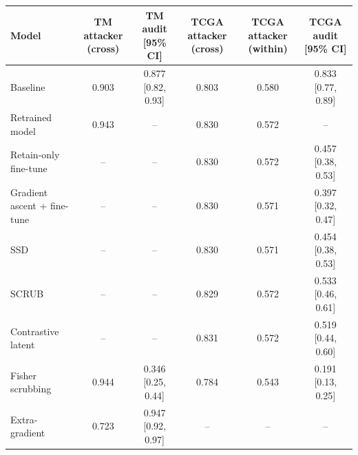 \begin{tabular}{lccccc}
\toprule
Model & TM attacker (cross) & TM audit [95\% CI] & TCGA attacker (cross) & TCGA attacker (within) & TCGA audit [95\% CI] \\
\midrule
Baseline & 0.903 & 0.877 [0.82, 0.93] & 0.803 & 0.580 & 0.833 [0.77, 0.89] \\
Retrained model & 0.943 & -- & 0.830 & 0.572 & -- \\
\midrule
Retain-only fine-tune & -- & -- & 0.830 & 0.572 & 0.457 [0.38, 0.53] \\
Gradient ascent + fine-tune & -- & -- & 0.830 & 0.571 & 0.397 [0.32, 0.47] \\
SSD & -- & -- & 0.830 & 0.571 & 0.454 [0.38, 0.53] \\
SCRUB & -- & -- & 0.829 & 0.572 & 0.533 [0.46, 0.61] \\
Contrastive latent & -- & -- & 0.831 & 0.572 & 0.519 [0.44, 0.60] \\
Fisher scrubbing & 0.944 & 0.346 [0.25, 0.44] & 0.784 & 0.543 & 0.191 [0.13, 0.25] \\
Extra-gradient & 0.723 & 0.947 [0.92, 0.97] & -- & -- & -- \\
\bottomrule
\end{tabular}
